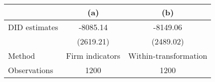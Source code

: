 \begin{tabular}{l*{2}{c}}
\hline\hline
                    &\multicolumn{1}{c}{(a)}&\multicolumn{1}{c}{(b)}\\
\hline
DID estimates       &    -8085.14&    -8149.06\\
                    &   (2619.21)&   (2489.02)\\
\hline
Method              &Firm indicators&Within-transformation\\
Observations        &        1200&        1200\\
\hline\hline
\end{tabular}
